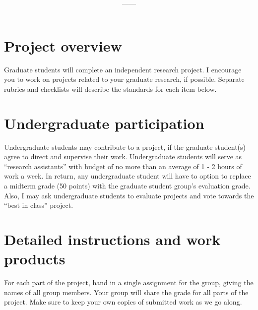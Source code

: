 \documentclass[11pt,onecolumn]{article}
\title{\textbf{\coursename}}
\author{{\semester}---{\roomnumb}---{\classtimes}}
\date{}
\makeatletter
\newcommand{\myname}{A.~Grant Schissler}
\newcommand{\myemail}{aschissler@unr.edu}
\newcommand{\office}{DMSC 224}
\newcommand{\officehours}{Tue 2:30pm-3:30pm, Wed 1:30pm-2:30pm, or by appointment}
\makeatother
\begin{document}
\maketitle

\vspace{-0.25in}
\noindent\makebox[\linewidth]{\rule{\textwidth}{1pt}}


\section*{Project overview}
Graduate students will complete an independent research project. I encourage you to work on projects related to your graduate research, if possible. Separate rubrics and checklists will describe the standards for each item below.

\section*{Undergraduate participation}

Undergraduate students may contribute to a project, if the graduate student(s) agree to direct and supervise their work. Undergraduate students will serve as ``research assistants'' with budget of no more than an average of 1 - 2 hours of work a week. In return, any undergraduate student will have to option to replace a midterm grade (50 points) with the graduate student group's evaluation grade. Also, I may ask undergraduate students to evaluate projects and vote towards the ``best in class'' project.

\section*{Detailed instructions and work products}

For each part of the project, hand in a single assignment for the group, giving the names of all group members. Your group will share the grade for all parts of the project. Make sure to keep your own copies of submitted work as we go along. 
\end{document}

